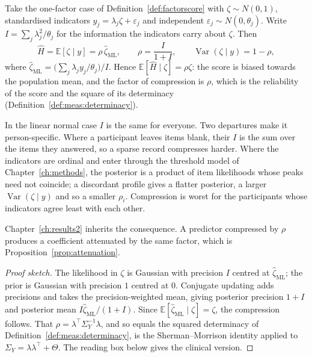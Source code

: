 \begin{proposition}
\label{prop:meas:shrinkage}
Take the one-factor case of Definition~\ref{def:factorscore} with
$\zeta\sim N(0,1)$, standardised indicators $y_j=\lambda_j\zeta+\varepsilon_j$
and independent $\varepsilon_j\sim N(0,\theta_j)$. Write
$I=\sum_j\lambda_j^{2}/\theta_j$ for the information the indicators carry about
$\zeta$. Then
\begin{equation}
  \widehat H=\mathbb E[\zeta\mid y]=\rho\,\widehat\zeta_{\mathrm{ML}},
  \qquad \rho=\frac{I}{1+I},
  \qquad \operatorname{Var}(\zeta\mid y)=1-\rho,
  \label{eq:shrinkage}
\end{equation}
where $\widehat\zeta_{\mathrm{ML}}=\bigl(\sum_j\lambda_jy_j/\theta_j\bigr)/I$.
Hence $\mathbb E[\widehat H\mid\zeta]=\rho\zeta$: the score is biased towards
the population mean, and the factor of compression is $\rho$, which is the
reliability of the score and the square of its determinacy
(Definition~\ref{def:meas:determinacy}).

In the linear normal case $I$ is the same for everyone. Two departures make it
person-specific. Where a participant leaves items blank, their $I$ is the sum
over the items they answered, so a sparse record compresses harder. Where the
indicators are ordinal and enter through the threshold model of
Chapter~\ref{ch:methods}, the posterior is a product of item likelihoods whose
peaks need not coincide; a discordant profile gives a flatter posterior, a
larger $\operatorname{Var}(\zeta\mid y)$ and so a smaller $\rho_i$. Compression
is worst for the participants whose indicators agree least with each other.

Chapter~\ref{ch:results2} inherits the consequence. A predictor compressed by
$\rho$ produces a coefficient attenuated by the same factor, which is
Proposition~\ref{prop:attenuation}.
\end{proposition}

\begin{proof}[Proof sketch]
The likelihood in $\zeta$ is Gaussian with precision $I$ centred at
$\widehat\zeta_{\mathrm{ML}}$; the prior is Gaussian with precision $1$ centred
at $0$. Conjugate updating adds precisions and takes the precision-weighted
mean, giving posterior precision $1+I$ and posterior mean
$I\widehat\zeta_{\mathrm{ML}}/(1+I)$. Since
$\mathbb E[\widehat\zeta_{\mathrm{ML}}\mid\zeta]=\zeta$, the compression
follows. That $\rho=\lambda^{\!\top}\Sigma_Y^{-1}\lambda$, and so equals the
squared determinacy of Definition~\ref{def:meas:determinacy}, is the
Sherman--Morrison identity applied to $\Sigma_Y=\lambda\lambda^{\!\top}+\Theta$.
The reading box below gives the clinical version.
\end{proof}

